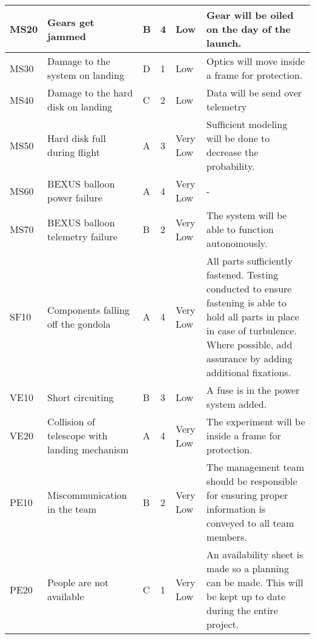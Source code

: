 \begin{longtable}{|m{}| m{} |m{} |m{}|m{}| m{}|}
MS20 & Gears get jammed														& B & 4 & \cellcolor[HTML]{FCFF2F}Low			& Gear will be oiled on the day of the launch. \\\hline

MS30 & Damage to the system on landing										& D & 1 & \cellcolor[HTML]{FCFF2F}Low			& Optics will move inside a frame for protection.\\\hline

MS40 & Damage to the hard disk on landing									& C & 2 & \cellcolor[HTML]{FCFF2F}Low			& Data will be send over telemetry\\\hline

MS50 & Hard disk full during flight											& A & 3 & \cellcolor[HTML]{34FF34}Very Low	& Sufficient modeling will be done to decrease the probability.\\\hline

MS60 & BEXUS balloon power failure											& A & 4 & \cellcolor[HTML]{34FF34}Very Low	& -\\\hline

MS70 & BEXUS balloon telemetry failure										& B & 2 & \cellcolor[HTML]{34FF34}Very Low	& The system will be able to function autonomously.\\\hline


SF10 & Components falling off the gondola									& A & 4 & \cellcolor[HTML]{34FF34}Very Low	& All parts sufficiently fastened. Testing conducted to ensure fastening is able to hold all parts in place in case of turbulence. Where possible, add assurance by adding additional fixations.\\\hline


VE10 & Short circuiting														& B & 3 & \cellcolor[HTML]{FCFF2F}Low			& A fuse is in the power system added.\\\hline

VE20 & Collision of telescope with landing mechanism						& A & 4 & \cellcolor[HTML]{34FF34}Very Low	& The experiment will be inside a frame for protection.\\\hline


PE10 & Miscommunication in the team											& B & 2 & \cellcolor[HTML]{34FF34}Very Low	& The management team should be responsible for ensuring proper information is conveyed to all team members.\\\hline

PE20 & People are not available												& C & 1 & \cellcolor[HTML]{34FF34}Very Low	& An availability sheet is made so a planning can be made. This will be kept up to date during the entire project.\\\hline


\end{longtable}

